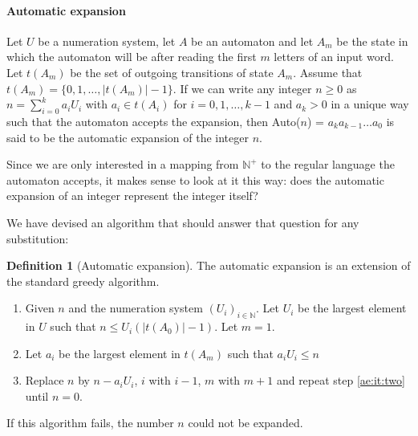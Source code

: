 \documentclass{article}
\theoremstyle{definition}
\newtheorem{definition}[theorem]{Definition}
\begin{document}
\paragraph{Automatic expansion}
Let $U$ be a numeration system, let $A$ be an automaton and let $A_m$ be 
the state in which the automaton will be after reading the first $m$ letters 
of an input word. Let $t(A_m)$ be the set of outgoing transitions of state 
$A_m$. Assume that $t(A_m) = \{0, 1, \ldots, |t(A_m)| - 1\}$. If we can write 
any integer $n \ge 0$ as $n = \sum_{i = 0}^k a_i U_i$ with 
$a_i \in t(A_i)$ for $i = 0, 1, \ldots, k - 1$ and $a_k > 0$
in a unique way such that the automaton accepts the expansion, then 
Auto($n$) = $a_k a_{k - 1} \ldots a_0$ is said to be the automatic expansion 
of the integer $n$.

Since we are only interested in a mapping from $\mathbb{N}^+$ to the regular
language the automaton accepts, it makes sense to look at it this way: does
the automatic expansion of an integer represent the integer itself?

We have devised an algorithm that should answer that question for any
substitution:

\begin{definition}[Automatic expansion] \label{def:autoexpand}
The automatic expansion is an extension of the standard greedy algorithm.
\begin{enumerate}
\item Given $n$ and the numeration system $(U_i)_{i \in \mathbb{N}}$. Let 
      $U_i$ be the largest element in $U$ such that $n \le U_i (|t(A_0)| - 1)$.
      Let $m = 1$.
\item Let $a_i$ be the largest element in $t(A_m)$ such that 
      $a_i U_i \le n$ \label{ae:it:two}
\item Replace $n$ by $n - a_i U_i$, $i$ with $i - 1$, $m$ with $m + 1$ and 
      repeat step \ref{ae:it:two} until $n = 0$.
\end{enumerate}
\end{definition}
If this algorithm fails, the number $n$ could not be expanded.
\end{document}
